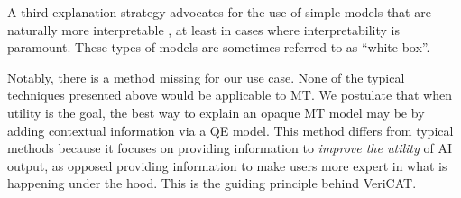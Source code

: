 A third explanation strategy advocates for the use of simple models that are naturally more interpretable \cite{rudin2018stop}, at least in cases where interpretability is paramount. These types of models are sometimes referred to as “white box”. %

Notably, there is a method missing for our use case. None of the typical techniques presented above would be applicable to MT. We postulate that when utility is the goal, the best way to explain an opaque MT model may be by adding contextual information via a QE model. This method differs from typical methods because it focuses on providing information to \textit{improve the utility} of AI output, as opposed providing information to make users more expert in what is happening under the hood. This is the guiding principle behind VeriCAT.   

